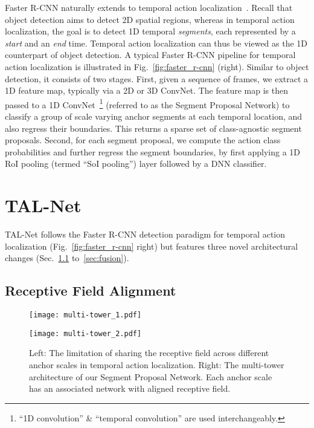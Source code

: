 \documentclass[10pt,twocolumn,letterpaper]{article}
\begin{document}
Faster R-CNN naturally extends to temporal action
localization~\cite{gao:bmvc2017,dai:iccv2017,xu:iccv2017}. Recall that object
detection aims to detect 2D spatial regions, whereas in temporal action
localization, the goal is to detect 1D temporal \textit{segments}, each
represented by a \textit{start} and an \textit{end} time. Temporal action
localization can thus be viewed as the 1D counterpart of object detection. A
typical Faster R-CNN pipeline for temporal action localization is illustrated
in Fig.~\ref{fig:faster_r-cnn} (right). Similar to object detection, it
consists of two stages. First, given a sequence of frames, we extract a 1D
feature map, typically via a 2D or 3D ConvNet. The feature map is then passed
to a 1D ConvNet~\footnote{``1D convolution'' \& ``temporal convolution'' are
used interchangeably.} (referred to as the Segment Proposal Network) to
classify a group of scale varying anchor segments at each temporal location,
and also regress their boundaries. This returns a sparse set of class-agnostic
segment proposals. Second, for each segment proposal, we compute the action
class probabilities and further regress the segment boundaries,
by first applying a 1D RoI pooling (termed ``SoI pooling'') layer followed by a
DNN classifier.

\section{TAL-Net}

TAL-Net follows the Faster R-CNN detection paradigm for temporal action
localization (Fig.~\ref{fig:faster_r-cnn} right) but features three novel
architectural changes (Sec.~\ref{sec:receptive} to~\ref{sec:fusion}).




\subsection{Receptive Field Alignment}
\label{sec:receptive}

\begin{figure*}[t]
\centering
 \begin{minipage}{0.48\textwidth}
  \centering
  \texttt{[image: multi-tower\_1.pdf]}
 \end{minipage}
 \hspace{5mm}
 \begin{minipage}{0.48\textwidth}
  \centering
  \texttt{[image: multi-tower\_2.pdf]}
 \end{minipage}
 \vspace{-1mm}
 \caption{\small Left: The limitation of sharing the receptive field across
different anchor scales in temporal action localization. Right: The multi-tower
architecture of our Segment Proposal Network. Each anchor scale has an
associated network with aligned receptive field.}
 \vspace{-2mm}
 \label{fig:multi-tower}
\end{figure*}
\end{document}
